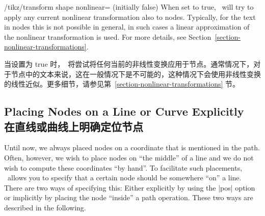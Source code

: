 \begin{key}{/tikz/transform shape nonlinear=  (initially false)}
    When set to true, \tikzname\ will try to apply any current nonlinear
    transformation also to nodes. Typically, for the text in nodes this is not
    possible in general, in such cases a linear approximation of the nonlinear
    transformation is used. For more details, see
    Section~\ref{section-nonlinear-transformations}.
    
    当设置为 true 时，\tikzname\ 将尝试将任何当前的非线性变换应用于节点。通常情况下，对于节点中的文本来说，这在一般情况下是不可能的，这种情况下会使用非线性变换的线性近似。更多细节，请参见第~\ref{section-nonlinear-transformations} 节。
\makeatletter
\begin{codeexample}[
    preamble={\usepgfmodule{nonlineartransformations}\usetikzlibrary{curvilinear}},
    pre={\makeatletter},
]
\end{codeexample}
\end{key}


\subsection{Placing Nodes on a Line or Curve Explicitly\\在直线或曲线上明确定位节点}
\label{section-nodes-placing-1}

Until now, we always placed nodes on a coordinate that is mentioned in the path.
Often, however, we wish to place nodes on ``the middle'' of a line and we do
not wish to compute these coordinates ``by hand''. To facilitate such
placements, \tikzname\ allows you to specify that a certain node should be
somewhere ``on'' a line. There are two ways of specifying this: Either
explicitly by using the |pos| option or implicitly by placing the node
``inside'' a path operation. These two ways are described in the following.

